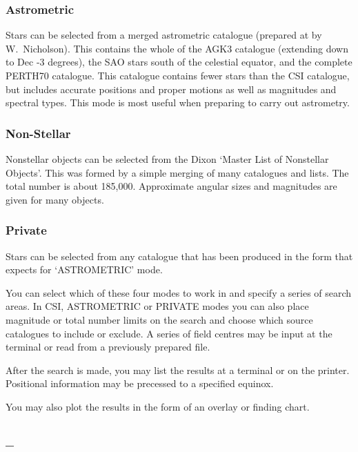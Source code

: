 \subsubsection{Astrometric}

Stars can be selected from a merged astrometric catalogue (prepared at {\RGOref} by
W.~Nicholson). This contains the whole of the AGK3 catalogue (extending down
to Dec -3 degrees), the SAO stars south of the celestial equator, and the complete
PERTH70 catalogue. This catalogue contains fewer stars than the CSI
catalogue, but includes accurate positions and proper motions as well as
magnitudes and spectral types. This mode is most useful when preparing to
carry out astrometry. 

\subsubsection{Non-Stellar}

Nonstellar objects can be selected from the Dixon `Master List of Nonstellar
Objects'. This was formed by a simple merging of many catalogues and lists. 
The total number is about 185,000. Approximate angular sizes and magnitudes
are given for many objects. 

\subsubsection{Private}

Stars can be selected from any catalogue that has been produced in the form
that {\CHARTref} expects for `ASTROMETRIC' mode. 

You can select which of these four modes to work in and specify a series of
search areas. In CSI, ASTROMETRIC or PRIVATE modes you can also place
magnitude or total number limits on the search and choose which source
catalogues to include or exclude. A series of field centres may be input at
the terminal or read from a previously prepared file. 
 
After the search is made, you may list the results at a terminal or on the
printer. Positional information may be precessed to a specified equinox. 
 
You may also plot the results in the form of an overlay or finding chart.


\subsection{{\COCOref} -- {\STARLINKref}} 
\label{sec:coco}
 

